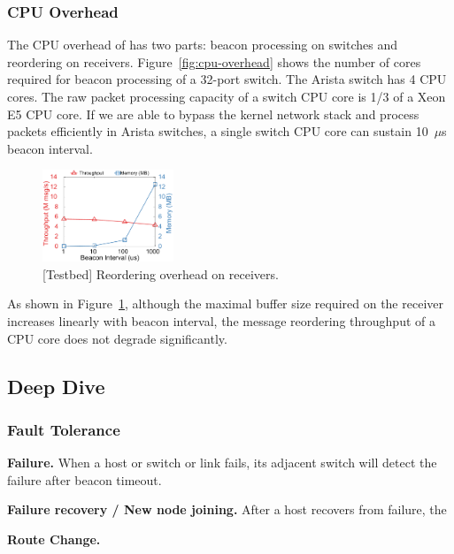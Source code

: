 \subsubsection{CPU Overhead}
\label{sec:eval-cpu-overhead}

The CPU overhead of \sys has two parts: beacon processing on switches and reordering on receivers.
Figure~\ref{fig:cpu-overhead} shows the number of cores required for beacon processing of a 32-port switch. The Arista switch has 4 CPU cores. The raw packet processing capacity of a switch CPU core is 1/3 of a Xeon E5 CPU core. If we are able to bypass the kernel network stack and process packets efficiently in Arista switches, a single switch CPU core can sustain 10~$\mu$s beacon interval.


\begin{figure}[t]
\centering
\includegraphics[width=0.35\textwidth]{gnuplot/reorder_receiver.pdf}
\caption{[Testbed] Reordering overhead on receivers.}
\label{fig:reorder-overhead}
\end{figure}

As shown in Figure~\ref{fig:reorder-overhead}, although the maximal buffer size required on the receiver increases linearly with beacon interval, the message reordering throughput of a CPU core does not degrade significantly.

\iffalse
\subsection{Deep Dive}

\subsubsection{Fault Tolerance}
\label{sec:eval-fault-tolerance}

\textbf{Failure.}
When a host or switch or link fails, its adjacent switch will detect the failure after beacon timeout.

\textbf{Failure recovery / New node joining.}
After a host recovers from failure, the 

\textbf{Route Change.}

